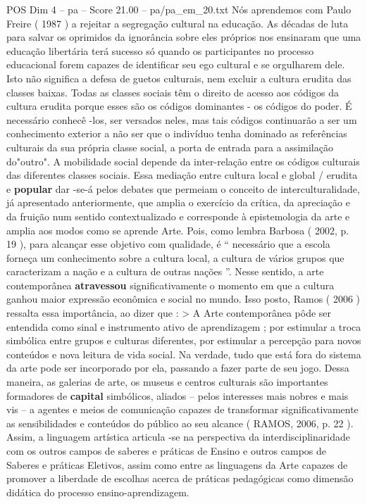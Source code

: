 \begin{textsample}{POS Dim 4 – pa – Score 21.00 – pa/pa\_em\_20.txt}
Nós aprendemos com Paulo Freire ( 1987 ) a rejeitar a segregação cultural na educação.
As décadas de luta para salvar os oprimidos da ignorância sobre eles próprios nos ensinaram que uma educação libertária terá sucesso só quando os participantes no processo educacional forem capazes de identificar seu ego cultural e se orgulharem dele.
Isto não significa a defesa de guetos culturais, nem excluir a cultura erudita das classes baixas.
Todas as classes sociais têm o direito de acesso aos códigos da cultura erudita porque esses são os códigos dominantes - os códigos do poder.
É necessário conhecê -los, ser versados neles, mas tais códigos continuarão a ser um conhecimento exterior a não ser que o indivíduo tenha dominado as referências culturais da sua própria classe social, a porta de entrada para a assimilação do"outro".
A mobilidade social depende da inter-relação entre os códigos culturais das diferentes classes sociais.
Essa mediação entre cultura local e global / erudita e \textbf{popular} dar -se-á pelos debates que permeiam o conceito de interculturalidade, já apresentado anteriormente, que amplia o exercício da crítica, da apreciação e da fruição num sentido contextualizado e corresponde à epistemologia da arte e amplia aos modos como se aprende Arte.
Pois, como lembra Barbosa ( 2002, p. 19 ), para alcançar esse objetivo com qualidade, é “ necessário que a escola forneça um conhecimento sobre a cultura local, a cultura de vários grupos que caracterizam a nação e a cultura de outras nações ”.
Nesse sentido, a arte contemporânea \textbf{atravessou} significativamente o momento em que a cultura ganhou maior expressão econômica e social no mundo.
Isso posto, Ramos ( 2006 ) ressalta essa importância, ao dizer que : > A Arte contemporânea pôde ser entendida como sinal e instrumento ativo de aprendizagem ; por estimular a troca simbólica entre grupos e culturas diferentes, por estimular a percepção para novos conteúdos e nova leitura de vida social.
Na verdade, tudo que está fora do sistema da arte pode ser incorporado por ela, passando a fazer parte de seu jogo.
Dessa maneira, as galerias de arte, os museus e centros culturais são importantes formadores de \textbf{capital} simbólicos, aliados – pelos interesses mais nobres e mais vis – a agentes e meios de comunicação capazes de transformar significativamente as sensibilidades e conteúdos do público ao seu alcance ( RAMOS, 2006, p. 22 ).
Assim, a linguagem artística articula -se na perspectiva da interdisciplinaridade com os outros campos de saberes e práticas de Ensino e outros campos de Saberes e práticas Eletivos, assim como entre as linguagens da Arte capazes de promover a liberdade de escolhas acerca de práticas pedagógicas como dimensão didática do processo ensino-aprendizagem.

\end{textsample}
